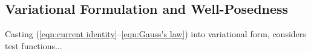 \subsection*{Variational Formulation and Well-Posedness}
    
    Casting (\ref{eqn:current identity}–\ref{eqn:Gauss's law}) into variational form, \BA{[LHF22]} considers test functions...
    